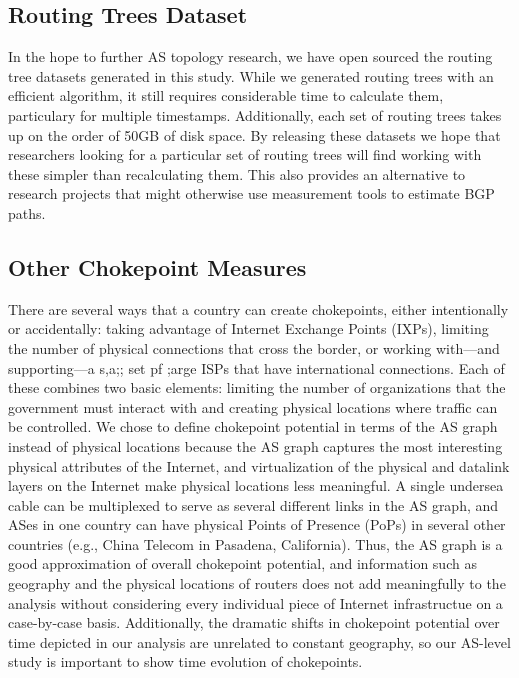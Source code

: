 \documentclass[10pt, conference, letterpaper]{IEEEtran}
\begin{document}
\subsection{Routing Trees Dataset}
In the hope to further AS topology research, we have open sourced the routing tree datasets generated in this study. While we generated routing trees
with an efficient algorithm, it still requires considerable time to calculate them, particulary for multiple timestamps. Additionally, each set of routing trees
takes up on the order of 50GB of disk space. By releasing these datasets we hope that researchers looking for a particular set of routing trees will find
working with these simpler than recalculating them. This also provides an alternative to research projects that might otherwise use measurement tools to estimate
BGP paths.

\subsection{Other Chokepoint Measures}
There are several ways that a country can create chokepoints, either intentionally or accidentally: taking advantage of Internet Exchange Points (IXPs),
limiting the number of physical connections that cross the border, or working with---and supporting---a s,a;; set pf ;arge ISPs that have international connections.
Each of these combines two basic elements: limiting the number of organizations that the government must interact with and creating physical locations where traffic can be controlled.
We chose to define chokepoint potential in terms of the AS graph instead of physical locations because the AS graph captures the most interesting physical attributes of the Internet, and
virtualization of the physical and datalink layers on the Internet make physical locations less meaningful. A single undersea cable can be multiplexed to serve as several different links in
the AS graph, and ASes in one country can have physical Points of Presence (PoPs) in several other countries (e.g., China Telecom in Pasadena, California). Thus, the AS graph is a good approximation
of overall chokepoint potential, and information such as geography and the physical locations of routers does not add meaningfully to the analysis without considering every individual piece of Internet
infrastructue on a case-by-case basis. Additionally, the dramatic shifts in chokepoint potential over time depicted in our analysis are unrelated to constant geography, so our AS-level study is important
to show time evolution of chokepoints.
\end{document}
